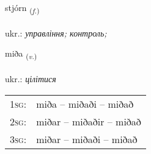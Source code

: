 \documentclass[frontgrid, backgrid]{flacards}\usepackage[]{graphicx}\usepackage[]{xcolor}
\begin{document}
\renewcommand{\flhead}{\vskip5pt \fboxsep=0pt {\small\bfseries\footnotesize Nafnorð | іменник}}
\renewcommand{\fcfoot}{\vskip5pt \fboxsep=0pt \hspace{2pt}{\small\bfseries\footnotesize 1K}}

\renewcommand{\blhead}{\vskip5pt {\small\bfseries\footnotesize Nafnorð | іменник }}
\renewcommand{\bcfoot}{\vskip5pt \hspace{2pt}{\small\bfseries\footnotesize 1K}}


{stjórn \small{\textsubscript{(\textit{f.})}} \\[1ex] %
\textphonetic{[stjourtn̥]} \\
ukr.: \emph{управління; контроль;} \\  [2ex]
\renewcommand*{\arraystretch}{0.8}
}

\renewcommand{\flhead}{\vskip5pt \fboxsep=0pt {\small\bfseries\footnotesize Sagnorð | дієслово}}
\renewcommand{\fcfoot}{\vskip5pt \fboxsep=0pt \hspace{2pt}{\small\bfseries\footnotesize 1K}}

\renewcommand{\blhead}{\vskip5pt {\small\bfseries\footnotesize Sagnorð | дієслово }}
\renewcommand{\bcfoot}{\vskip5pt \hspace{2pt}{\small\bfseries\footnotesize 1K}}


{miða \small{\textsubscript{(\textit{v.})}} \\[1ex] %
\textphonetic{[mɪːða]} \\
ukr.: \emph{цілітися} \\  [2ex]
\renewcommand*{\arraystretch}{0.8}
\begin{tabular}{p{1cm}l}
\textsc{1sg}: & miða -- miðaði -- miðað \\ 
\textsc{2sg}: & miðar -- miðaðir -- miðað \\ 
\textsc{3sg}: & miðar -- miðaði -- miðað \\ 
\end{tabular}
}
\end{document}
